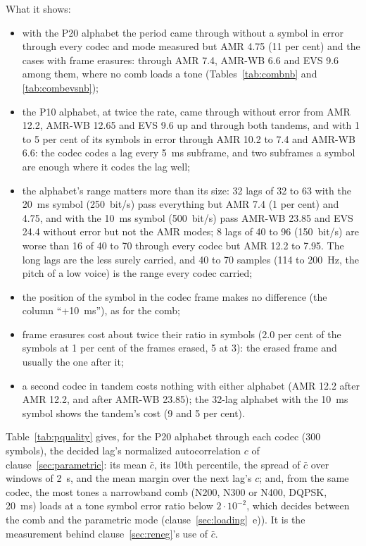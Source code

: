 \begin{table}[htbp]
\caption{The pulse train's period through the codecs: lag symbol error ratio by alphabet and symbol period (raw rate in bit/s in the heading); 0 is no symbol in error}
\label{tab:pitch}
\centering\scriptsize
\resizebox{\textwidth}{!}{\tabpitch}
\end{table}

What it shows:
\begin{itemize}
\item with the P20 alphabet the period came through without a symbol in
  error through every codec and mode measured but AMR 4.75 (11 per cent)
  and the cases with frame erasures: through AMR 7.4, AMR-WB 6.6 and EVS
  9.6 among them, where no comb loads a tone (Tables~\ref{tab:combnb}
  and \ref{tab:combevsnb});
\item the P10 alphabet, at twice the rate, came through without error
  from AMR 12.2, AMR-WB 12.65 and EVS 9.6 up and through both tandems,
  and with 1 to 5 per cent of its symbols in error through AMR 10.2 to
  7.4 and AMR-WB 6.6: the codec codes a lag every 5~ms subframe, and two
  subframes a symbol are enough where it codes the lag well;
\item the alphabet's range matters more than its size: 32 lags of 32 to
  63 with the 20~ms symbol (250~bit/s) pass everything but AMR 7.4 (1
  per cent) and 4.75, and with the 10~ms symbol (500~bit/s) pass AMR-WB
  23.85 and EVS 24.4 without error but not the AMR modes; 8 lags of 40
  to 96 (150~bit/s) are worse than 16 of 40 to 70 through every codec
  but AMR 12.2 to 7.95.  The long lags are the less surely carried, and
  40 to 70 samples (114 to 200~Hz, the pitch of a low voice) is the
  range every codec carried;
\item the position of the symbol in the codec frame makes no difference
  (the column ``+10~ms''), as for the comb;
\item frame erasures cost about twice their ratio in symbols (2.0 per
  cent of the symbols at 1 per cent of the frames erased, 5 at 3): the
  erased frame and usually the one after it;
\item a second codec in tandem costs nothing with either alphabet (AMR
  12.2 after AMR 12.2, and after AMR-WB 23.85); the 32-lag alphabet with
  the 10~ms symbol shows the tandem's cost (9 and 5 per cent).
\end{itemize}

Table~\ref{tab:pquality} gives, for the P20 alphabet through each codec
(300 symbols), the decided lag's normalized autocorrelation $c$ of
clause~\ref{sec:parametric}: its mean $\bar c$, its 10th percentile, the
spread of $\bar c$ over windows of 2~s, and the mean margin over the next
lag's $c$; and, from the same codec, the most tones a narrowband comb
(N200, N300 or N400, DQPSK, 20~ms) loads at a tone symbol error ratio
below $2 \cdot 10^{-2}$, which decides between the comb and the
parametric mode (clause~\ref{sec:loading}~e)).  It is the measurement
behind clause~\ref{sec:reneg}'s use of $\bar c$.

